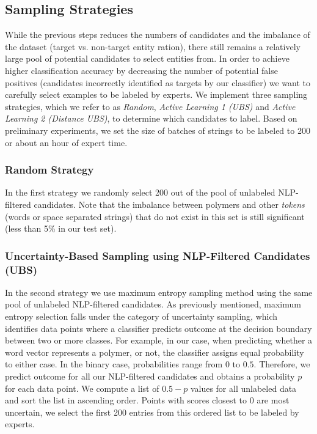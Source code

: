 \subsection{Sampling Strategies}
While the previous steps reduces the numbers of candidates and the imbalance of the dataset (target vs. non-target entity ration), there still remains a relatively large pool of potential candidates to select entities from.
In order to achieve higher classification accuracy\textemdash
by decreasing the number of potential false positives (candidates incorrectly identified as targets by our classifier)
\textemdash we want to carefully select examples to be labeled by experts.
We implement three sampling strategies, which we refer to as \textit{Random}, \textit{Active Learning 1 (UBS)} and \textit{Active Learning 2 (Distance UBS)}, 
to determine which candidates to label.
Based on preliminary experiments, we set the size of batches of strings to be labeled to 200 or about an hour of expert time.

\subsubsection{Random Strategy}
In the first strategy we randomly select 200 out of the pool of unlabeled NLP-filtered candidates.
Note that the imbalance between polymers and other \textit{tokens} (words or space separated strings) that 
do not exist in this set is still significant (less than 5\% in our test set).

\subsubsection{Uncertainty-Based Sampling using NLP-Filtered Candidates (UBS)}
In the second strategy we use maximum entropy sampling method using the same pool of unlabeled NLP-filtered candidates.
As previously mentioned, maximum entropy selection falls under the category of uncertainty sampling, which identifies data points where a classifier predicts outcome at the decision boundary between two or more classes. 
For example, in our case, when predicting whether a word vector represents a polymer, or not, the classifier assigns equal probability to either case.
In the binary case, probabilities range from $0$ to $0.5$. Therefore, we predict outcome for all our NLP-filtered candidates and obtains a probability $p$ for each data point. We compute a list of $0.5-p$ values for all unlabeled data and sort the list in ascending order.
Points with scores closest to $0$ are most uncertain, we select the first 200 entries from this ordered list to be labeled by experts.

